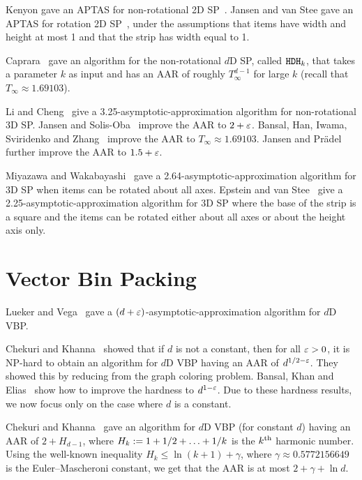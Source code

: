 Kenyon gave an APTAS for non-rotational 2D SP~\cite{kenyon1996strip}.
Jansen and van Stee gave an APTAS for rotation 2D SP~\cite{jansen2005strip},
under the assumptions that items have width and height at most 1
and that the strip has width equal to 1.

Caprara~\cite{caprara2008} gave an algorithm for the
non-rotational $d$D SP, called $\operatorname{\mathtt{HDH}}_{k}$,
that takes a parameter $k$ as input and has an AAR of roughly
$T_{\infty}^{d-1}$ for large $k$
(recall that $T_{\infty} \approx 1.69103$).

Li and Cheng~\cite{li1990three} give a 3.25-asymptotic-approximation
algorithm for non-rotational 3D SP.
Jansen and Solis-Oba~\cite{jansen2006asymptotic} improve the AAR to $2+\varepsilon$.
Bansal, Han, Iwama, Sviridenko and Zhang~\cite{bansal2007harmonic}
improve the AAR to $T_{\infty} \approx 1.69103$.
Jansen and Pr\"adel~\cite{jansen2014new} further improve the AAR to $1.5 + \varepsilon$.

Miyazawa and Wakabayashi~\cite{miyazawa2009three} gave a
2.64-asymptotic-approximation algorithm for 3D SP
when items can be rotated about all axes.
Epstein and van Stee~\cite{epstein2006side} give a
2.25-asymptotic-approximation algorithm for 3D SP
where the base of the strip is a square
and the items can be rotated either about all axes
or about the height axis only.

\section{Vector Bin Packing}

Lueker and Vega~\cite{bp-aptas} gave a $(d+\varepsilon)$-asymptotic-approximation
algorithm for $d$D VBP.

Chekuri and Khanna~\cite{chekuri-khanna-vbp} showed that
if $d$ is not a constant, then for all $\varepsilon > 0$, it is NP-hard to
obtain an algorithm for $d$D VBP having an AAR of $d^{1/2-\varepsilon}$.
They showed this by reducing from the graph coloring problem.
Bansal, Khan and Elias~\cite{bansal2016improved}
show how to improve the hardness to $d^{1-\varepsilon}$.
Due to these hardness results, we now focus only on the case where $d$ is a constant.

Chekuri and Khanna~\cite{chekuri-khanna-vbp} gave an algorithm for $d$D VBP
(for constant $d$) having an AAR of $2 + H_{d-1}$, where
$H_k := 1 + 1/2 + \ldots + 1/k$ is the $k^{\textrm{th}}$ harmonic number.
Using the well-known inequality $H_k \le \ln(k+1) + \gamma$,
where $\gamma \approx 0.5772156649$ is the Euler–Mascheroni constant,
we get that the AAR is at most $2 + \gamma + \ln d$.

